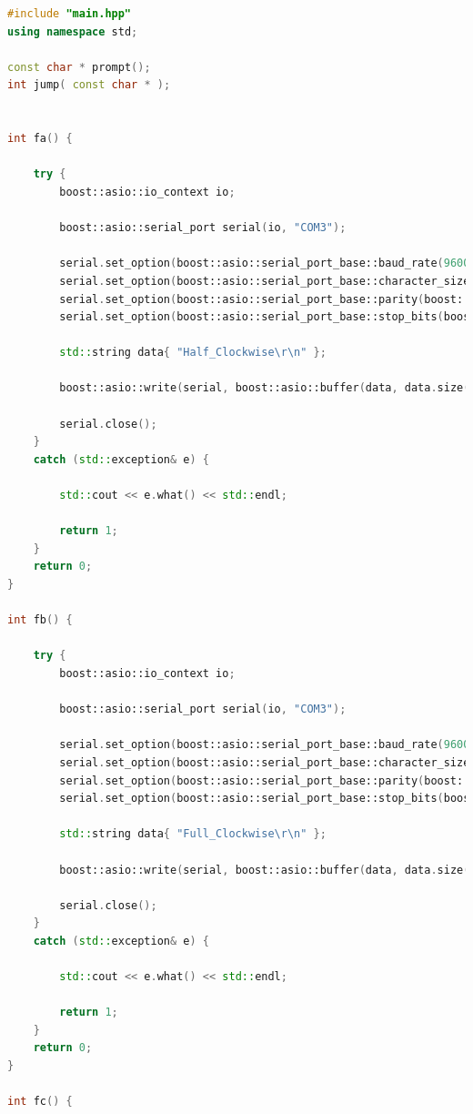 \documentclass[transmag]{IEEEtran}
\begin{document}
\begin{lstlisting}[language=C++, caption=PC controller program - Serial Communication - Main file]
#include "main.hpp"
using namespace std;

const char * prompt();
int jump( const char * );


int fa() {

    try {
        boost::asio::io_context io;

        boost::asio::serial_port serial(io, "COM3");

        serial.set_option(boost::asio::serial_port_base::baud_rate(9600));
        serial.set_option(boost::asio::serial_port_base::character_size(8));
        serial.set_option(boost::asio::serial_port_base::parity(boost::asio::serial_port_base::parity::none));
        serial.set_option(boost::asio::serial_port_base::stop_bits(boost::asio::serial_port_base::stop_bits::one));

        std::string data{ "Half_Clockwise\r\n" };

        boost::asio::write(serial, boost::asio::buffer(data, data.size()));

        serial.close();
    }
    catch (std::exception& e) {

        std::cout << e.what() << std::endl;

        return 1;
    }
    return 0;
}

int fb() {

    try {
        boost::asio::io_context io;

        boost::asio::serial_port serial(io, "COM3");

        serial.set_option(boost::asio::serial_port_base::baud_rate(9600));
        serial.set_option(boost::asio::serial_port_base::character_size(8));
        serial.set_option(boost::asio::serial_port_base::parity(boost::asio::serial_port_base::parity::none));
        serial.set_option(boost::asio::serial_port_base::stop_bits(boost::asio::serial_port_base::stop_bits::one));

        std::string data{ "Full_Clockwise\r\n" };

        boost::asio::write(serial, boost::asio::buffer(data, data.size()));

        serial.close();
    }
    catch (std::exception& e) {

        std::cout << e.what() << std::endl;

        return 1;
    }
    return 0;
}

int fc() {


\end{lstlisting}
\end{document}
